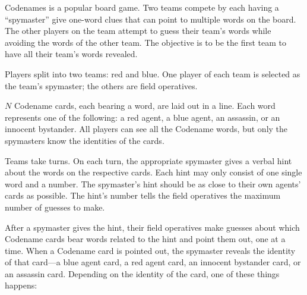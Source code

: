 
\def\probname{Codenames}
\def\probno{?}
\def \headeryear {2020/2021}
\fullheader
\par
Codenames is a popular board game. Two teams compete by each having a
``spymaster'' give one-word clues that can point to multiple words on
the board. The other players on the team attempt to guess their
team's words while avoiding the words of the other team. The
objective is to be the first team to have all their team's words
revealed.
\par
Players split into two teams: red and blue. One player of each team
is selected as the team's spymaster; the others are field operatives.
\par
$N$ Codename cards, each bearing a word, are laid out in a line. Each
word represents one of the following: a red agent, a blue agent, an
assassin, or an innocent bystander. All players can see all the
Codename words, but only the spymasters know the identities of the
cards.
\par
Teams take turns. On each turn, the appropriate spymaster gives a
verbal hint about the words on the respective cards. Each hint may
only consist of one single word and a number. The spymaster's hint
should be as close to their own agents' cards as possible. The hint's
number tells the field operatives the maximum number of guesses to
make.
\par
After a spymaster gives the hint, their field operatives make guesses
about which Codename cards bear words related to the hint and point
them out, one at a time. When a Codename card is pointed out, the
spymaster reveals the identity of that card---a blue agent card, a
red agent card, an innocent bystander card, or an assassin
card. Depending on the identity of the card, one of these things
happens:

